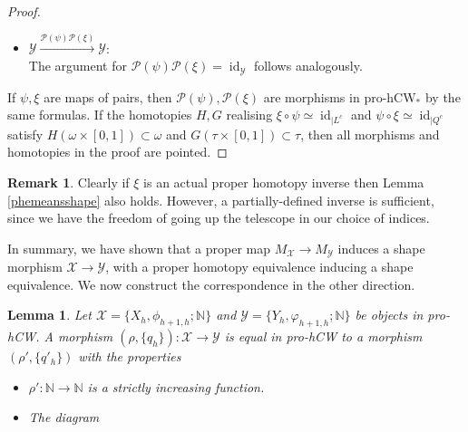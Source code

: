 \documentclass[a4paper,11pt]{article}
\theoremstyle{definition}
\newtheorem*{remark}{Remark}
\theoremstyle{plain}
\newtheorem{lemma}[definition]{Lemma}
\theoremstyle{remark}
\DeclareMathOperator{\id}{id}
\begin{document}
{\begin{proof}
\begin{itemize}
Consider $\mathfrak{q}^{X}_{i} H$ restricted to ${X}_{k} \times \{k+1\}$. We have that $\mathfrak{q}^{X}_{i}\xi \psi_{|{X}_{k} \times \{k+1\}}$ is homotopic to $\mathfrak{q}^{X}_{i}$. Thus the diagram (under appropriate identifications)
\begin{figure}[H]
\center
{}
 \end{figure}
 commutes. This shows that $\mathcal{P}(\xi)\mathcal{P}(\psi)$ is equivalent to $\id_{\mathcal{X}}$ in pro-hCW. 

\item $\mathcal{Y}\xrightarrow{\mathcal{P}(\psi)\mathcal{P}(\xi)} \mathcal{Y}$:\\
The argument for $\mathcal{P}(\psi)\mathcal{P}(\xi) = \id_{\mathcal{Y}}$ follows analogously. 
\end{itemize}

If $\psi,\xi$ are maps of pairs, then $\mathcal{P}(\psi),\mathcal{P}(\xi)$ are morphisms in pro-hCW$_{\ast}$ by the same formulas. If the homotopies $H,G$ realising $\xi \circ \psi \simeq \id_{|L^c}$ and $\psi\circ \xi \simeq \id_{|Q^c}$ satisfy $H(\omega \times [0,1])\subset \omega$ and $G(\tau \times [0,1]) \subset \tau$, then all morphisms and homotopies in the proof are pointed. 
\end{proof}


\begin{remark} Clearly if $\xi$ is an actual proper homotopy inverse then Lemma \ref{phemeansshape} also holds. However, a partially-defined inverse is sufficient, since we have the freedom of going up the telescope in our choice of indices. 
\end{remark}

In summary, we have shown that a proper map $M_{\mathcal{X}}\rightarrow M_{\mathcal{Y}}$ induces a shape morphism $\mathcal{X}\rightarrow \mathcal{Y}$, with a proper homotopy equivalence inducing a shape equivalence. We now construct the correspondence in the other direction. 


\begin{lemma} \label{modify} Let $\mathcal{X}=\{X_{h}, \phi_{h+1,h}; \mathbb{N}\}$ and $\mathcal{Y}=\{Y_{h}, \varphi_{h+1,h}; \mathbb{N}\}$ be objects in pro-hCW. A morphism $(\rho,\{q_{h}\}): \mathcal{X}\rightarrow \mathcal{Y}$ is equal in pro-hCW to a morphism $(\rho',\{q'_{h}\})$ with the properties
\begin{itemize}
\item $\rho': \mathbb{N}\rightarrow \mathbb{N}$ is a strictly increasing function. 
\item The diagram


\end{itemize}
\end{lemma}}
\end{document}
